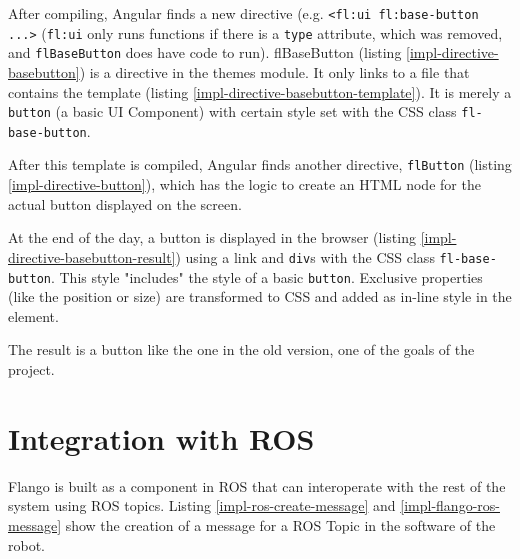 

After compiling, Angular finds a new directive (e.g.  \lstinline$<fl:ui fl:base-button ...>$ (\texttt{fl:ui} only runs functions if there is a \texttt{type} attribute, which was removed, and \texttt{flBaseButton} does have code to run).
flBaseButton (listing \ref{impl-directive-basebutton}) is a directive in the themes module.
It only links to a file that contains the template (listing \ref{impl-directive-basebutton-template}).
It is merely a \texttt{button} (a basic UI Component) with certain style set with the \ac{CSS} class \texttt{fl-base-button}.




After this template is compiled, Angular finds another directive, \texttt{flButton} (listing \ref{impl-directive-button}), which has the logic to create an \ac{HTML} node for the actual button displayed on the screen.





At the end of the day, a button is displayed in the browser (listing \ref{impl-directive-basebutton-result}) using a link and \texttt{div}s with the \ac{CSS} class \texttt{fl-base-button}.
This style "includes" the style of a basic \texttt{button}.
Exclusive properties (like the position or size) are transformed to \ac{CSS} and added as in-line style in the element.

The result is a button like the one in the old version, one of the goals of the project.

\section{Integration with ROS}
\label{sec:integration-with-ROS}
Flango \cm is built as a component in \ac{ROS} that can interoperate with the rest of the system using \ac{ROS} topics.
Listing \ref{impl-ros-create-message} and \ref{impl-flango-ros-message} show the creation of a message for a ROS Topic in the software of the robot.

